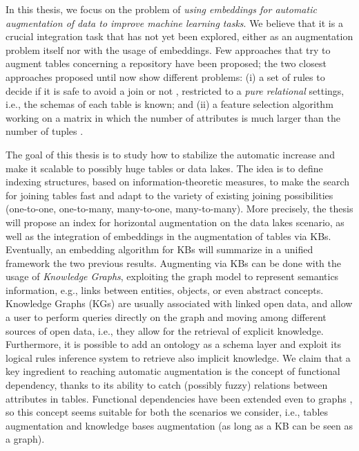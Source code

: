 In this thesis, we focus on the problem of \textit{using embeddings for automatic augmentation of data to improve machine learning tasks}. We believe that it is a crucial integration task that has not yet been explored, either as an augmentation problem itself nor with the usage of embeddings. Few approaches that try to augment tables concerning a repository have been proposed; the two closest approaches proposed until now show different problems: (i) a set of rules to decide if it is safe to avoid a join or not \cite{kumar2016join}, restricted to a \textit{pure relational} settings, i.e., the schemas of each table is known; and (ii) a feature selection algorithm working on a matrix in which the number of attributes is much larger than the number of tuples \cite{chepurko2020arda}. 

The goal of this thesis is to study how to stabilize the automatic increase and make it scalable to possibly huge tables or data lakes. The idea is to define indexing structures, based on information-theoretic measures, to make the search for joining tables fast and adapt to the variety of existing joining possibilities (one-to-one, one-to-many, many-to-one, many-to-many). More precisely, the thesis will propose an index for horizontal augmentation on the data lakes scenario, as well as the integration of embeddings in the augmentation of tables via KBs. Eventually, an embedding algorithm for KBs will summarize in a unified framework the two previous results. Augmenting via KBs can be done with the usage of \textit{Knowledge Graphs}, exploiting the graph model to represent semantics information, e.g., links between entities, objects, or even abstract concepts. Knowledge Graphs (KGs) are usually associated with linked open data, and allow a user to perform queries directly on the graph and moving among different sources of open data, i.e., they allow for the retrieval of explicit knowledge. Furthermore, it is possible to add an ontology as a schema layer and exploit its logical rules inference system to retrieve also implicit knowledge.
We claim that a key ingredient to reaching automatic augmentation is the concept of functional dependency, thanks to its ability to catch (possibly fuzzy) relations between attributes in tables. Functional dependencies have been extended even to graphs \cite{fan2016functional}, so this concept seems suitable for both the scenarios we consider, i.e., tables augmentation and knowledge bases augmentation (as long as a KB can be seen as a graph). 


